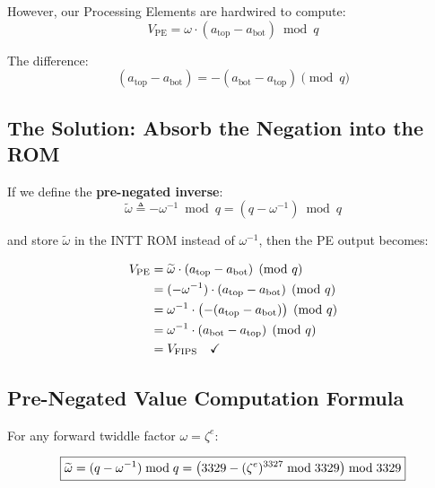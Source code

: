 \documentclass[11pt,a4paper]{article}
\newcommand{\modneg}[1]{\widetilde{#1}}
\begin{document}
However, our Processing Elements are hardwired to compute:
\begin{equation}
  V_{\text{PE}} = \omega \cdot (a_{\text{top}} - a_{\text{bot}}) \bmod q
  \label{eq:pe-butterfly}
\end{equation}

The difference:
\begin{equation}
  (a_{\text{top}} - a_{\text{bot}}) = -(a_{\text{bot}} - a_{\text{top}}) \pmod{q}
\end{equation}

\subsection{The Solution: Absorb the Negation into the ROM}

If we define the \textbf{pre-negated inverse}:
\begin{equation}
  \modneg{\omega} \triangleq -\omega^{-1} \bmod q = (q - \omega^{-1}) \bmod q
  \label{eq:pre-neg-def}
\end{equation}

and store $\modneg{\omega}$ in the INTT ROM instead of $\omega^{-1}$, then the PE output becomes:

\begin{align}
  V_{\text{PE}}
  &= \modneg{\omega} \cdot (a_{\text{top}} - a_{\text{bot}}) \pmod{q} \notag \\
  &= (-\omega^{-1}) \cdot (a_{\text{top}} - a_{\text{bot}}) \pmod{q} \notag \\
  &= \omega^{-1} \cdot \bigl(-(a_{\text{top}} - a_{\text{bot}})\bigr) \pmod{q} \notag \\
  &= \omega^{-1} \cdot (a_{\text{bot}} - a_{\text{top}}) \pmod{q} \notag \\
  &= V_{\text{FIPS}} \quad \checkmark
  \label{eq:pre-neg-proof}
\end{align}

\subsection{Pre-Negated Value Computation Formula}

For any forward twiddle factor $\omega = \zeta^{e}$:

\begin{equation}
  \boxed{%
    \modneg{\omega}
    = (q - \omega^{-1}) \bmod q
    = \bigl(3329 - (\zeta^{e})^{3327} \bmod 3329\bigr) \bmod 3329
  }
  \label{eq:pre-neg-formula}
\end{equation}
\end{document}
